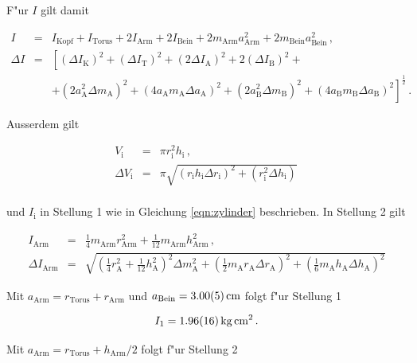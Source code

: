 				F"ur $I$ gilt damit

				\begin{eqnarray*}
					I & = & I_\mathrm{Kopf} + I_\mathrm{Torus} + 2 I_\mathrm{Arm} + 2 I_\mathrm{Bein} + 2 m_\mathrm{Arm}a_\mathrm{Arm}^2 + 2 m_\mathrm{Bein}a_\mathrm{Bein}^2 \,, \\
					\Delta I & = & \left[(\Delta I_\mathrm{K})^2 + (\Delta I_\mathrm{T})^2 + (2 \Delta I_\mathrm{A})^2 + 2(\Delta I_\mathrm{B})^2 +\right. \\
					&& \left. + (2a_\mathrm{A}^2 \Delta m_\mathrm{A})^2 + (4 a_\mathrm{A}m_\mathrm{A} \Delta a_\mathrm{A})^2 + (2a_\mathrm{B}^2 \Delta m_\mathrm{B})^2 + (4 a_\mathrm{B}m_\mathrm{B} \Delta a_\mathrm{B})^2\right]^\frac{1}{2} \,.
				\end{eqnarray*}

				Ausserdem gilt

				\begin{eqnarray*}
					V_\mathrm{i} & = & \pi r_\mathrm{i}^2 h_\mathrm{i} \,, \\
					\Delta V_\mathrm{i} & = & \pi \sqrt{(r_\mathrm{i} h_\mathrm{i} \Delta r_\mathrm{i})^2 + (r_\mathrm{i}^2 \Delta h_\mathrm{i})} \, \\
				\end{eqnarray*}

				und $I_\mathrm{i}$ in Stellung 1 wie in Gleichung \eqref{eqn:zylinder} beschrieben. In Stellung 2 gilt

				\begin{eqnarray*}
					I_\mathrm{Arm} & = & \frac{1}{4}m_\mathrm{Arm}r_\mathrm{Arm}^2 + \frac{1}{12}m_\mathrm{Arm}h_\mathrm{Arm}^2 \,, \\
					\Delta I_\mathrm{Arm} & = & \sqrt{\left(\frac{1}{4}r_\mathrm{A}^2 + \frac{1}{12}h_\mathrm{A}^2\right)^2 \Delta m_\mathrm{A}^2 + \left(\frac{1}{2}m_\mathrm{A}r_\mathrm{A}\Delta r_\mathrm{A}\right)^2 + \left(\frac{1}{6}m_\mathrm{A}h_\mathrm{A}\Delta h_\mathrm{A}\right)^2}
				\end{eqnarray*}

				Mit $a_\mathrm{Arm} = r_\mathrm{Torus} + r_\mathrm{Arm}$ und $a_\mathrm{Bein} = \SI{3.00 (5)}{\centi \meter}$ folgt f"ur Stellung 1

				\begin{equation*}
					I_1 = \SI{1.96 (16)}{\kilo \gram \centi \meter \squared} \,.
				\end{equation*}

				Mit $a_\mathrm{Arm} = r_\mathrm{Torus} + h_\mathrm{Arm} / 2$ folgt f"ur Stellung 2

